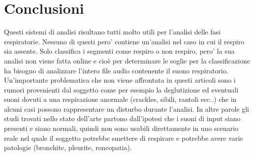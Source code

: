 \section{Conclusioni}
  Questi sistemi di analisi risultano tutti molto utili per l'analisi delle fasi respiratorie.
  Nessuno di questi pero' contiene un'analisi nel caso in cui il respiro sia assente. 
  Solo \cite{ASTFARA} classifica i segmenti come respiro o non respiro, pero' la sua analisi non viene fatta online e cio\`e per determinare le soglie per la classificazione ha bisogno di analizzare l'intero file audio contenente il suono respiratorio.
  Un'importante problematica che non viene affrontata in questi articoli sono i rumori provenienti dal soggetto come per esempio la deglutizione ed eventuali suoni dovuti a una respirazione anormale (crackles, sibili, rantoli ecc..) che in alcuni casi possono rappresentare un disturbo durante l'analisi.
  In altre parole gli studi trovati nello stato dell'arte partono dall'ipotesi che i suoni di input siano presenti e siano normali, quindi non sono usabili direttamente in uno scenario reale nel quale il soggetto potrebbe smettere di respirare e potrebbe avere varie patologie (bronchite, pleurite, roncopatia). 
  






